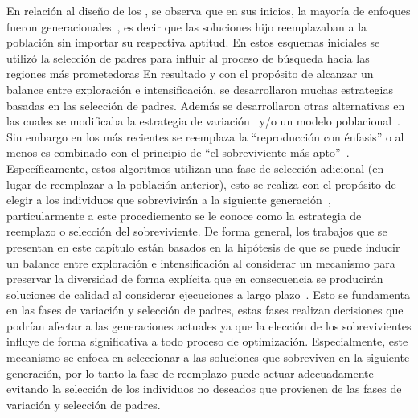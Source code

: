 En relación al diseño de los \EAS{}, se observa que en sus inicios, la mayoría de enfoques fueron generacionales~\cite{de2006evolutionary}, es decir que las soluciones hijo reemplazaban a la población sin importar su respectiva aptitud.
%
En estos esquemas iniciales se utilizó la selección de padres para influir al proceso de búsqueda hacia las regiones más prometedoras
%
En resultado y con el propósito de alcanzar un balance entre exploración e intensificación, se desarrollaron muchas estrategias basadas en las selección de padres.
%
Además se desarrollaron otras alternativas en las cuales se modificaba la estrategia de variación~\cite{Joel:herrera2003fuzzy} y/o un modelo poblacional~\cite{alba2005parallel}.
%
Sin embargo en los \EAS{} más recientes se reemplaza la ``reproducción con énfasis'' o al menos es combinado con el principio de ``el sobreviviente más apto''~\cite{Joel:CHC}.
%
Específicamente, estos algoritmos utilizan una fase de selección adicional (en lugar de reemplazar a la población anterior), esto se realiza con el propósito de elegir a los individuos que sobrevivirán a la siguiente generación~\cite{eiben2003introduction}, particularmente a este procediemento se le conoce como la estrategia de reemplazo o selección del sobreviviente.
%
De forma general, los trabajos que se presentan en este capítulo están basados en la hipótesis de que se puede inducir un balance entre exploración e intensificación al considerar un mecanismo para preservar la diversidad de forma explícita que en consecuencia se producirán soluciones de calidad al considerar ejecuciones a largo plazo~\cite{segura2016novel}.
%
Esto se fundamenta en las fases de variación y selección de padres, estas fases realizan decisiones que podrían afectar a las generaciones actuales ya que la elección de los sobrevivientes influye  de forma significativa a todo proceso de optimización.
%
Especialmente, este mecanismo se enfoca en seleccionar a las soluciones que sobreviven en la siguiente generación, por lo tanto la fase de reemplazo puede actuar adecuadamente evitando la selección de los individuos no deseados que provienen de las fases de variación y selección de padres.

